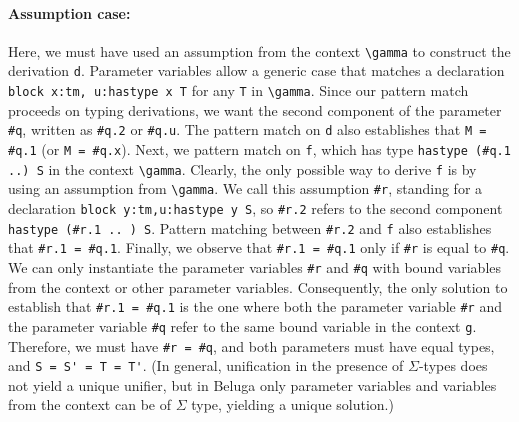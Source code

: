  \paragraph{Assumption case:} Here, we must have used an assumption from the
 context \lstinline!\gamma! to construct the derivation \lstinline{d}.  Parameter variables
  allow a generic case that matches a declaration
\lstinline!block x:tm, u:hastype x T! for any \lstinline{T} in \lstinline!\gamma!. Since our pattern match
 proceeds on typing derivations, we want the second component of the
 parameter \lstinline{#q}, written as \lstinline{#q.2} or \lstinline!#q.u!.  The pattern match on \lstinline{d}
 also establishes that \lstinline{M = #q.1} (or \lstinline!M = #q.x!).
 Next, we pattern match on \lstinline{f}, which has type
\lstinline!hastype (#q.1 ..) S! in the context \lstinline!\gamma!.  Clearly, the only
 possible way to derive \lstinline{f} is by using an assumption from \lstinline!\gamma!. We call
 this assumption \lstinline{#r}, standing for a declaration
\lstinline!block y:tm,u:hastype y S!, so \lstinline{#r.2} refers to the second component
\lstinline!hastype (#r.1 .. ) S!. Pattern matching between \lstinline{#r.2} and \lstinline{f}
 also establishes that %
 \lstinline{#r.1 = #q.1}.  Finally, we observe that \lstinline{#r.1 = #q.1} only if
 \lstinline{#r} is equal to \lstinline{#q}. We can only instantiate the parameter
 variables \lstinline!#r! and \lstinline!#q! with bound variables from
 the context or other parameter variables. Consequently, the only
 solution to establish that \lstinline{#r.1 = #q.1} is the one where both the
 parameter variable \lstinline!#r! and the parameter variable
 \lstinline!#q! refer to the same bound variable in
 the context \lstinline!g!.  Therefore, we must have
 \lstinline!#r = #q!, and both
 parameters must have equal types, and \lstinline{S = S' = T = T'}.  (In general,
 unification in the presence
 of $\Sigma$-types does not yield a unique unifier, but in Beluga only
 parameter variables and variables from the context can be of $\Sigma$ type,
 yielding a unique solution.)

